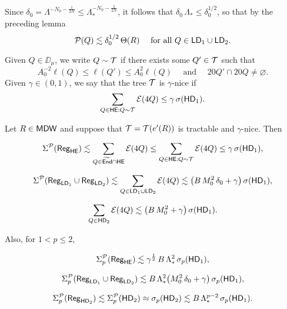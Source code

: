 \begin{rem}\label{rem9.7}
Since $\delta_0 = \Lambda^{-N_0 - \frac1{2N}}\le \Lambda_*^{-N_0 - \frac1{2N}}$, it follows that $\delta_0\,\Lambda_*
\leq \delta_0^{1/2}$, so that by the preceding lemma
 $${\mathcal P}(Q)\lesssim \delta_0^{1/2}\,\Theta(R)\quad \mbox{ for all $Q\in{\mathsf{LD}}_1\cup{\mathsf{LD}}_2$.}$$
\end{rem}

\vv
Given $Q\in\DD_\mu$, we write $Q\sim {\mathcal T}$ if there exists some
$Q'\in{\mathcal T}$ such that 
\begin{equation}\label{defsim0}
A_0^{-2}\ell(Q)\leq \ell(Q')\leq A_0^2\ell(Q)\quad \text{ and }\quad 20Q'\cap20Q\neq\varnothing.
\end{equation}
Given $\gamma\in(0,1)$, we say that the tree ${\mathcal T}$ is $\gamma$-nice if
$$\sum_{Q\in{\mathsf {HE}}:Q\sim{\mathcal T}} {\mathcal E}(4Q)\leq\gamma \,\sigma({\mathsf{HD}}_1).$$


\vv
\begin{lemma}\label{lemregmolt}
Let $R\in{\mathsf{MDW}}$ and suppose that ${\mathcal T}={\mathcal T}(e'(R))$ is tractable and $\gamma$-nice.
Then


\begin{equation}\label{eqlem*1}
\Sigma^{\mathcal P}({\mathsf{Reg}}_{\mathsf {HE}}) \lesssim \sum_{Q\in{\widetilde{{\mathsf{End}}}}\cap {\mathsf {HE}}}{\mathcal E}(4Q)\leq
\sum_{Q\in{\mathsf {HE}}:Q\sim {\mathcal T}}{\mathcal E}(4Q)
\leq \gamma\,\sigma({\mathsf{HD}}_1),
\end{equation}

\begin{equation}\label{eqlem*2}
\Sigma^{\mathcal P}({\mathsf{Reg}}_{{\mathsf{LD}}_1}\cup {\mathsf{Reg}}_{{\mathsf{LD}}_2}) \lesssim \sum_{Q\in
{\mathsf{LD}}_1\cup {\mathsf{LD}}_2} {\mathcal E}(4Q)\lesssim 
\big(B\,M_0^2\,\delta_0 + \gamma\big)\,\sigma({\mathsf{HD}}_1),
\end{equation}

\begin{equation}\label{eqlem*2.5}
 \sum_{Q\in{\mathsf{HD}}_2} {\mathcal E}(4Q)\lesssim \big(B\,M_0^2 + \gamma\big)\,\sigma({\mathsf{HD}}_1).
\end{equation}

\noi Also, for $1<p\leq2$,

\begin{equation}\label{eqlem*3}
\Sigma_p^{\mathcal P}({\mathsf{Reg}}_{\mathsf {HE}})\lesssim  \gamma^{\frac 12}\,B\,\Lambda_*^2\,\sigma_p({\mathsf{HD}}_1),
\end{equation}

\begin{equation}\label{eqlem*4}
\Sigma_p^{\mathcal P}({\mathsf{Reg}}_{{\mathsf{LD}}_1}\cup{\mathsf{Reg}}_{{\mathsf{LD}}_2})\lesssim B\,\Lambda_*^2
\big(M_0^2\,\delta_0 + \gamma\big)\,\sigma_p({\mathsf{HD}}_1),
\end{equation}

\begin{equation}\label{eqlem*5}
\Sigma_p^{\mathcal P}({\mathsf{Reg}}_{{\mathsf{HD}}_2})\lesssim \Sigma_p^{\mathcal P}({\mathsf{HD}}_2) \approx \sigma_p({\mathsf{HD}}_2) \lesssim B\,\Lambda_*^{p-2}\,\sigma_p({\mathsf{HD}}_1).
\end{equation}
\end{lemma}
\vv

